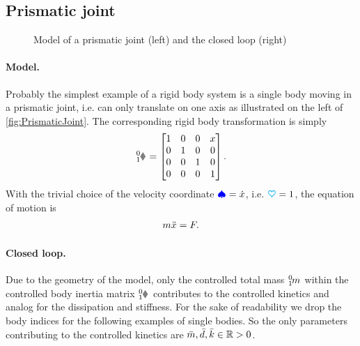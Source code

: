 \subsection{Prismatic joint}
\begin{figure}
 \centering
 
 \caption{Model of a prismatic joint (left) and the closed loop (right)}
 \label{fig:PrismaticJoint}
\end{figure}

\paragraph{Model.}
Probably the simplest example of a rigid body system is a single body moving in a prismatic joint, i.e. can only translate on one axis as illustrated on the left of \autoref{fig:PrismaticJoint}.
The corresponding rigid body transformation is simply
\begin{align}
 \bodyHomoCoord{0}{1} = \begin{bmatrix} 1 & 0 & 0 & x \\ 0 & 1 & 0 & 0 \\ 0 & 0 & 1 & 0 \\ 0 & 0 & 0 & 1\end{bmatrix}.
\end{align}
With the trivial choice of the velocity coordinate $\boldsymbol{\textcolor{blue}{\spadesuit}} = \dot{x}$, i.e. $\boldsymbol{\textcolor{cyan}{\heartsuit}} = 1$, the equation of motion is
\begin{align}
 m \ddot{x} = F.
\end{align}

\paragraph{Closed loop.}
Due to the geometry of the model, only the controlled total mass $\bodyMass{0}{1}$ within the controlled body inertia matrix $\bodyInertiaMat{0}{1}$ contributes to the controlled kinetics and analog for the dissipation and stiffness.
For the sake of readability we drop the body indices for the following examples of single bodies.
So the only parameters contributing to the controlled kinetics are $\bar{m}, \bar{d}, \bar{k} \in \mathbb{R} > 0$.


